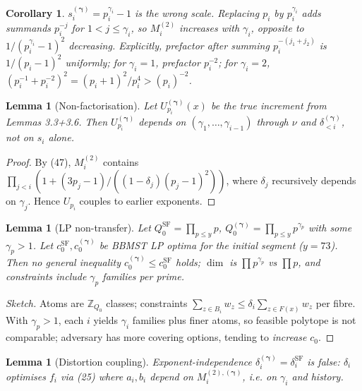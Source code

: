 \documentclass[11pt,a4paper]{article}
\theoremstyle{plain}
\newtheorem{lemma}[theorem]{Lemma}
\newtheorem{corollary}[theorem]{Corollary}
\theoremstyle{definition}
\theoremstyle{remark}
\newcommand{\Z}{\mathbb{Z}}
\begin{document}
\begin{corollary}
$s_{i}^{(\boldsymbol\gamma)}=p_{i}^{\gamma_{i}}-1$ is the wrong scale. Replacing $p_{i}$ by $p_{i}^{\gamma_{i}}$ adds summands $p_{i}^{-j}$ for $1<j\le\gamma_{i}$, so $M_{i}^{(2)}$ \emph{increases} with $\gamma_{i}$, opposite to $1/(p_{i}^{\gamma_{i}}-1)^{2}$ decreasing. Explicitly, prefactor after summing $p_{i}^{-(j_{1}+j_{2})}$ is $1/(p_{i}-1)^{2}$ uniformly; for $\gamma_{i}=1$, prefactor $p_{i}^{-2}$; for $\gamma_{i}=2$, $(p_{i}^{-1}+p_{i}^{-2})^{2}=(p_{i}+1)^{2}/p_{i}^{4}>(p_{i})^{-2}$.
\end{corollary}

\begin{lemma}[Non-factorisation]\label{lem:nonfact}
Let $U_{p_{i}}^{(\boldsymbol\gamma)}(x)$ be the true increment from Lemmas 3.3+3.6. Then $U_{p_{i}}^{(\boldsymbol\gamma)}$ depends on $(\gamma_{1},\dots,\gamma_{i-1})$ through $\nu$ and $\delta_{<i}^{(\boldsymbol\gamma)}$, not on $s_{i}$ alone.
\end{lemma}
\begin{proof}
By (47), $M_{i}^{(2)}$ contains $\prod_{j<i}(1+(3p_{j}-1)/((1-\delta_{j})(p_{j}-1)^{2}))$, where $\delta_{j}$ recursively depends on $\gamma_{j}$. Hence $U_{p_{i}}$ couples to earlier exponents.
\end{proof}

\begin{lemma}[LP non-transfer]\label{lem:LP}
Let $Q_{0}^{\mathrm{SF}}=\prod_{p\le y}p$, $Q_{0}^{(\boldsymbol\gamma)}=\prod_{p\le y}p^{\gamma_{p}}$ with some $\gamma_{p}>1$. Let $c_{0}^{\mathrm{SF}},c_{0}^{(\boldsymbol\gamma)}$ be BBMST LP optima for the initial segment ($y=73$). Then no general inequality $c_{0}^{(\boldsymbol\gamma)}\le c_{0}^{\mathrm{SF}}$ holds; $\dim$ is $\prod p^{\gamma_{p}}$ vs $\prod p$, and constraints include $\gamma_{p}$ families per prime.
\end{lemma}
\begin{proof}[Sketch]
Atoms are $ \Z_{Q_{0}}$ classes; constraints $\sum_{z\in B_{i}}w_{z}\le\delta_{i}\sum_{z\in F(x)}w_{z}$ per fibre. With $\gamma_{p}>1$, each $i$ yields $\gamma_{i}$ families plus finer atoms, so feasible polytope is not comparable; adversary has more covering options, tending to \emph{increase} $c_{0}$.
\end{proof}

\begin{lemma}[Distortion coupling]\label{lem:delta}
Exponent-independence $\delta_{i}^{(\boldsymbol\gamma)}=\delta_{i}^{\mathrm{SF}}$ is false: $\delta_{i}$ optimises $f_{i}$ via (25) where $a_{i},b_{i}$ depend on $M_{i}^{(2),(\boldsymbol\gamma)}$, i.e. on $\gamma_{i}$ and history.
\end{lemma}
\end{document}
